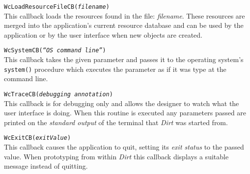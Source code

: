 \begin{description}
\item{\tt WcLoadResourceFileCB({\em filename})} \\
This callback loads the resources found in the file: {\em filename}.  These
resources are merged into the application's current resource database and can
be used by the application or by the user interface when new objects are
created.

\item{\tt WcSystemCB({\em ``OS command line''})} \\
This callback takes the given parameter and passes it to the operating
system's {\tt system()} procedure which executes the parameter as if it was
type at the command line.

\item{\tt WcTraceCB({\em debugging annotation})} \\
This callback is for debugging only and allows the designer to watch what the
user interface is doing.  When this routine is executed any parameters passed
are printed on the {\em standard output} of the terminal that {\em Dirt} was
started from.

\item{\tt WcExitCB({\em exitValue})} \\
This callback causes the application to quit, setting its {\em exit status}
to the passed value.  When prototyping from within {\em Dirt} this callback
displays a suitable message instead of quitting.

\end{description}

\newpage{}
